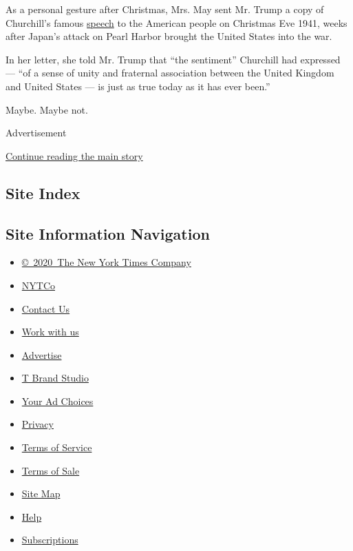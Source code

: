 As a personal gesture after Christmas, Mrs. May sent Mr. Trump a copy of
Churchill's famous
\href{http://www.dailymail.co.uk/news/article-4123924/Special-relationship-inspired-famous-British-American-Winston-Churchill-tells-Trump-letter-echoing-wartime-leader-s-famous-speech.html}{speech}
to the American people on Christmas Eve 1941, weeks after Japan's attack
on Pearl Harbor brought the United States into the war.

In her letter, she told Mr. Trump that ``the sentiment'' Churchill had
expressed --- ``of a sense of unity and fraternal association between
the United Kingdom and United States --- is just as true today as it has
ever been.''

Maybe. Maybe not.

Advertisement

\protect\hyperlink{after-bottom}{Continue reading the main story}

\hypertarget{site-index}{%
\subsection{Site Index}\label{site-index}}

\hypertarget{site-information-navigation}{%
\subsection{Site Information
Navigation}\label{site-information-navigation}}

\begin{itemize}
\tightlist
\item
  \href{https://help.nytimes.com/hc/en-us/articles/115014792127-Copyright-notice}{©~2020~The
  New York Times Company}
\end{itemize}

\begin{itemize}
\tightlist
\item
  \href{https://www.nytco.com/}{NYTCo}
\item
  \href{https://help.nytimes.com/hc/en-us/articles/115015385887-Contact-Us}{Contact
  Us}
\item
  \href{https://www.nytco.com/careers/}{Work with us}
\item
  \href{https://nytmediakit.com/}{Advertise}
\item
  \href{http://www.tbrandstudio.com/}{T Brand Studio}
\item
  \href{https://www.nytimes.com/privacy/cookie-policy\#how-do-i-manage-trackers}{Your
  Ad Choices}
\item
  \href{https://www.nytimes.com/privacy}{Privacy}
\item
  \href{https://help.nytimes.com/hc/en-us/articles/115014893428-Terms-of-service}{Terms
  of Service}
\item
  \href{https://help.nytimes.com/hc/en-us/articles/115014893968-Terms-of-sale}{Terms
  of Sale}
\item
  \href{https://spiderbites.nytimes.com}{Site Map}
\item
  \href{https://help.nytimes.com/hc/en-us}{Help}
\item
  \href{https://www.nytimes.com/subscription?campaignId=37WXW}{Subscriptions}
\end{itemize}
